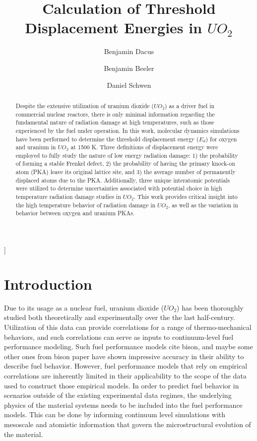 \documentclass[8pt]{article}   	%
\title{Calculation of Threshold Displacement Energies in $UO_2$}
\author[1]{Benjamin Dacus}
\author[2]{Benjamin Beeler}
\author[2]{Daniel Schwen}
\affil[1]{North Carolina State University, Raleigh, NC 27695}
\affil[2]{Idaho National Laboratory, Idaho Falls, ID 83415}
\begin{document}

\begin{@twocolumnfalse}
\maketitle
    \begin{abstract}
      Despite the extensive utilization of uranium dioxide ($UO_2$) as a driver fuel in commercial nuclear reactors, there is only minimal information regarding the fundamental nature of radiation damage at high temperatures, such as those experienced by the fuel under operation. In this work, molecular dynamics simulations have been performed to determine the threshold displacement energy ($E_d$) for oxygen and uranium in $UO_2$ at 1500 K. Three definitions of displacement energy were employed to fully study the nature of low energy radiation damage: 1) the probability of forming a stable Frenkel defect, 2) the probability of having the primary knock-on atom (PKA) leave its original lattice site, and 3) the average number of permanently displaced atoms due to the PKA. Additionally, three unique interatomic potentials were utilized to determine uncertainties associated with potential choice in high temperature radiation damage studies in $UO_2$. This work provides critical insight into the high temperature behavior of radiation damage in $UO_2$, as well as the variation in behavior between oxygen and uranium PKAs.       
    \end{abstract}
\end{@twocolumnfalse}
]

\clearpage
\newpage

\section{Introduction}

\hspace{5mm}
Due to its usage as a nuclear fuel, uranium dioxide ($UO_2$) has been thoroughly studied both theoretically and experimentally over the the last half-century. Utilization of this data can provide correlations for a range of thermo-mechanical behaviors, and such correlations can serve as inputs to continuum-level fuel performance modeling. Such fuel performance models {cite bison, and maybe some other ones from bison paper} have shown impressive accuracy in their ability to describe fuel behavior. However, fuel performance models that rely on empirical correlations are inherently limited in their applicability to the scope of the data used to construct those empirical models. In order to predict fuel behavior in scenarios outside of the existing experimental data regimes, the underlying physics of the material systems needs to be included into the fuel performance models. This can be done by informing continuum level simulations with mesoscale and atomistic information that govern the microstructural evolution of the material.
\end{document}
